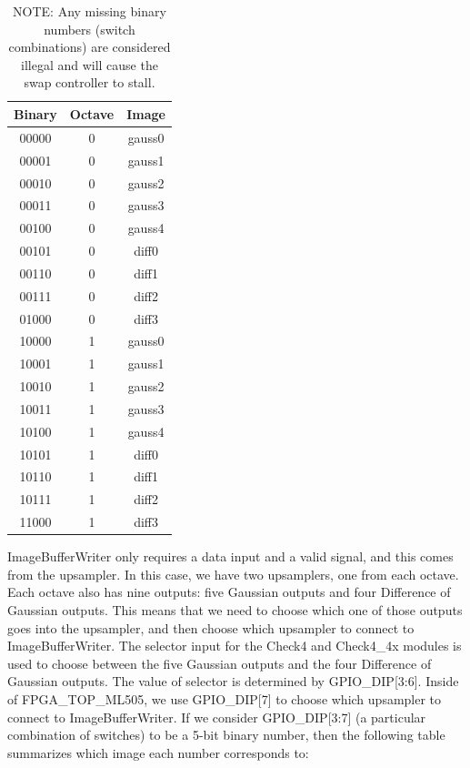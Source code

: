 \documentclass[12pt]{article}
\begin{document}
\begin{table}


    \begingroup
    \tiny
    \caption{ NOTE: Any missing binary numbers (switch combinations) are considered illegal 
and will cause the swap controller to stall.} \label{wrap-tab:1}
\begin{tabular}{ c | c | c } \toprule
Binary & Octave & Image\\\toprule
00000 & 0 & gauss0\\ \midrule
00001 & 0 & gauss1\\ \midrule
00010 & 0 & gauss2\\ \midrule
00011 & 0 & gauss3\\ \midrule
00100 & 0 & gauss4\\ \midrule
00101 & 0 & diff0\\  \midrule
00110 & 0 & diff1\\  \midrule
00111 & 0 & diff2\\  \midrule
01000 & 0 & diff3\\  \midrule
10000 & 1 & gauss0\\ \midrule
10001 & 1 & gauss1\\ \midrule
10010 & 1 & gauss2\\ \midrule
10011 & 1 & gauss3\\ \midrule
10100 & 1 & gauss4\\ \midrule
10101 & 1 & diff0\\  \midrule
10110 & 1 & diff1\\  \midrule
10111 & 1 & diff2\\  \midrule
11000 & 1 & diff3\\  \bottomrule
\end{tabular}
\endgroup
\end{table}


ImageBufferWriter only requires a data input and a valid signal, and this comes 
from the upsampler. In this case, we have two upsamplers, one from each octave. 
Each octave also has nine outputs: five Gaussian outputs and four Difference of 
Gaussian outputs. This means that we need to choose which one of those outputs 
goes into the upsampler, and then choose which upsampler to connect to 
ImageBufferWriter. The selector input for the Check4 and Check4\_4x modules is 
used to choose between the five Gaussian outputs and the four Difference of 
Gaussian outputs. The value of selector is determined by GPIO\_DIP[3:6]. Inside 
of FPGA\_TOP\_ML505, we use GPIO\_DIP[7] to choose which upsampler to connect to 
ImageBufferWriter. If we consider GPIO\_DIP[3:7] (a particular combination of 
switches) to be a 5-bit binary number, then the following table summarizes which 
image each number corresponds to:
\end{document}
